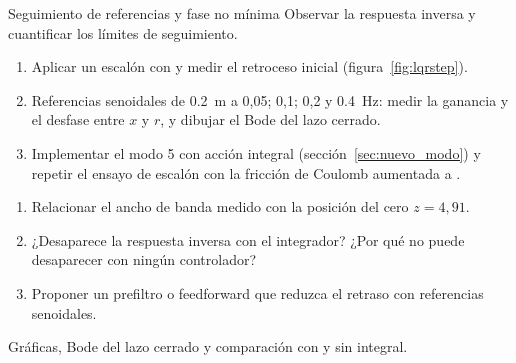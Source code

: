 \begin{practica}{Seguimiento de referencias y fase no mínima}
\objetivos Observar la respuesta inversa y cuantificar los límites de seguimiento.
\procedimiento
\begin{enumerate}
  \item Aplicar un escalón con  y medir el retroceso inicial (figura~\ref{fig:lqrstep}).
  \item Referencias senoidales de \SI{0.2}{m} a 0,05; 0,1; 0,2 y \SI{0.4}{Hz}: medir la ganancia y el desfase entre $x$ y $r$, y dibujar el Bode del lazo cerrado.
  \item Implementar el modo 5 con acción integral (sección~\ref{sec:nuevo_modo}) y repetir el ensayo de escalón con la fricción de Coulomb aumentada a .
\end{enumerate}
\preguntas
\begin{enumerate}
  \item Relacionar el ancho de banda medido con la posición del cero $z=4{,}91$.
  \item ¿Desaparece la respuesta inversa con el integrador? ¿Por qué no puede desaparecer con ningún controlador?
  \item Proponer un prefiltro o feedforward que reduzca el retraso con referencias senoidales.
\end{enumerate}
\entregables Gráficas, Bode del lazo cerrado y comparación con y sin integral.
\end{practica}

